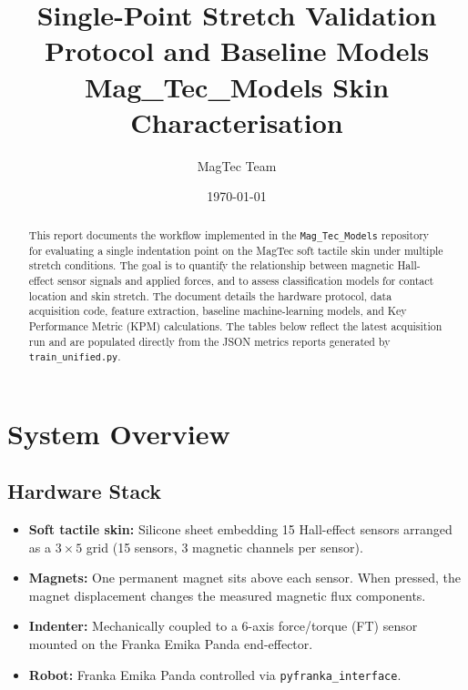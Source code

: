 \documentclass[11pt,a4paper]{article}
\title{Single-Point Stretch Validation Protocol and Baseline Models\\\large Mag\_Tec\_Models Skin Characterisation}
\author{MagTec Team}
\date{\today}
\begin{document}
\maketitle

\begin{abstract}
This report documents the workflow implemented in the \texttt{Mag\_Tec\_Models} repository for
evaluating a single indentation point on the MagTec soft tactile skin under multiple stretch
conditions. The goal is to quantify the relationship between magnetic Hall-effect sensor
signals and applied forces, and to assess classification models for contact location and skin
stretch. The document details the hardware protocol, data acquisition code, feature
extraction, baseline machine-learning models, and Key Performance Metric (KPM)
calculations. The tables below reflect the latest acquisition run and are populated directly from the JSON metrics reports generated by \texttt{train\_unified.py}.
\end{abstract}

\tableofcontents
\newpage

\section{System Overview}

\subsection{Hardware Stack}
\begin{itemize}[leftmargin=1.5em]
    \item \textbf{Soft tactile skin:} Silicone sheet embedding 15 Hall-effect sensors arranged
          as a \(3 \times 5\) grid (15 sensors, 3 magnetic channels per sensor).
    \item \textbf{Magnets:} One permanent magnet sits above each sensor. When pressed,
          the magnet displacement changes the measured magnetic flux components.
    \item \textbf{Indenter:} Mechanically coupled to a 6-axis force/torque (FT) sensor mounted
          on the Franka Emika Panda end-effector.
    \item \textbf{Robot:} Franka Emika Panda controlled via \texttt{pyfranka\_interface}.
\end{itemize}
\end{document}
